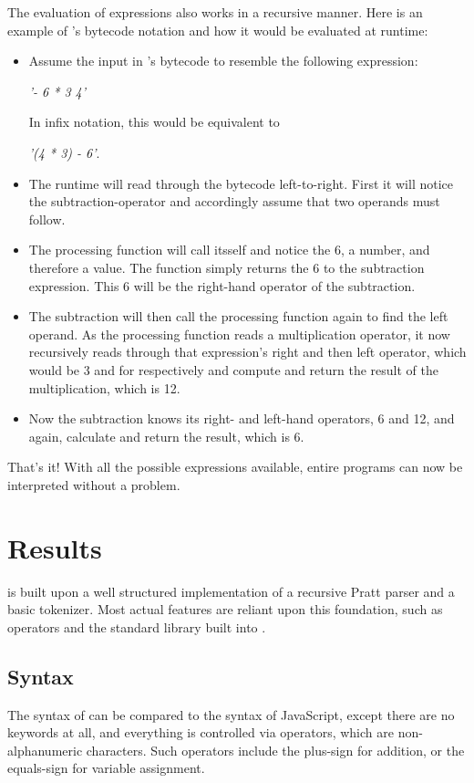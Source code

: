 \documentclass[12pt,a4paper,man]{apa7}
\newcommand{\expr}[1] {
    \begin{center}
        #1
    \end{center}
}
\begin{document}
The evaluation of expressions also works in a recursive manner. Here is an 
example of \name's bytecode notation and how it would be evaluated at runtime:
\begin{itemize}
    \item Assume the input in \name's bytecode to resemble the following expression: 
        \expr{\emph{'- 6 * 3 4'}}
        In infix notation, this would be equivalent to 
        \expr{\emph{'(4 * 3) - 6'}.}
    \item The runtime will read through the bytecode left-to-right. First it will
        notice the subtraction-operator and accordingly assume that two
        operands must follow.
    \item The processing function will call itsself
        and notice the 6, a number, and therefore a value. The function simply returns the 6
        to the subtraction expression. This 6 will be the right-hand operator
        of the subtraction.
    \item The subtraction will then call the processing function again to find
        the left operand. As the processing function reads a multiplication operator,
        it now recursively reads through that expression's right and then left
        operator, which would be 3 and for respectively and compute and return
        the result of the multiplication, which is 12.
    \item Now the subtraction knows its right- and left-hand operators, 6 and 12,
        and again, calculate and return the result, which is 6.
\end{itemize}

That's it! With all the possible expressions available, entire programs
can now be interpreted without a problem.

\section{Results}

\name is built upon a well structured implementation of a recursive Pratt
parser and a basic tokenizer. Most actual features are reliant upon this
foundation, such as operators and the standard library built into \name.

\subsection{Syntax}
The syntax of \name can be compared to the syntax of JavaScript, except
there are no keywords at all, and everything is controlled via operators,
which are non-alphanumeric characters. Such operators include the plus-sign 
for addition, or the equals-sign for variable assignment.
\end{document}

